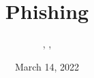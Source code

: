 \documentclass{../../../extra/styles/SecureRole}
\title{Phishing}
\author{\Ba, \Wi, \Zm}
\date{March 14, 2022}
\begin{document}
\makecover 

\tableofcontents

\newpage


\end{document}
